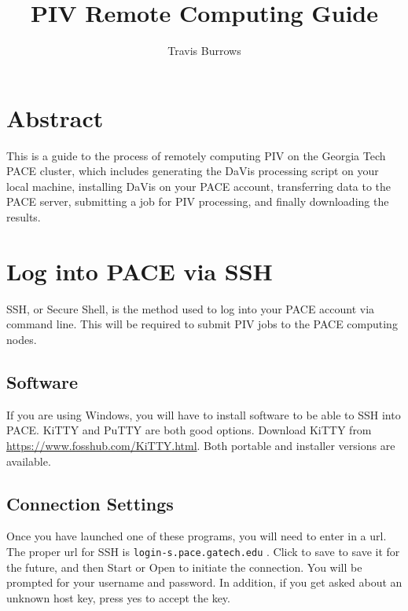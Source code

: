 \documentclass{article}
\begin{document}
	\title{PIV Remote Computing Guide}

	\author{Travis Burrows}
	\maketitle
	
	\tableofcontents
	\newpage
	
	\section{Abstract}
	This is a guide to the process of remotely computing PIV on the Georgia Tech PACE cluster, which includes generating the DaVis processing script on your local machine, installing DaVis on your PACE account, transferring data to the PACE server, submitting a job for PIV processing, and finally downloading the results.

	\section{Log into PACE via SSH}
	SSH, or Secure Shell, is the method used to log into your PACE account via command line.  This will be required to submit PIV jobs to the PACE computing nodes.
	
	\subsection{Software}
	If you are using Windows, you will have to install software to be able to SSH into PACE.  KiTTY and PuTTY are both good options.  Download KiTTY from \url{https://www.fosshub.com/KiTTY.html}.  Both portable and installer versions are available.
	
	\subsection{Connection Settings}
	Once you have launched one of these programs, you will need to enter in a url.  The proper url for SSH is \nolinkurl{login-s.pace.gatech.edu} .  Click to save to save it for the future, and then Start or Open to initiate the connection.  You will be prompted for your username and password.  In addition, if you get asked about an unknown host key, press yes to accept the key.  
\end{document}
